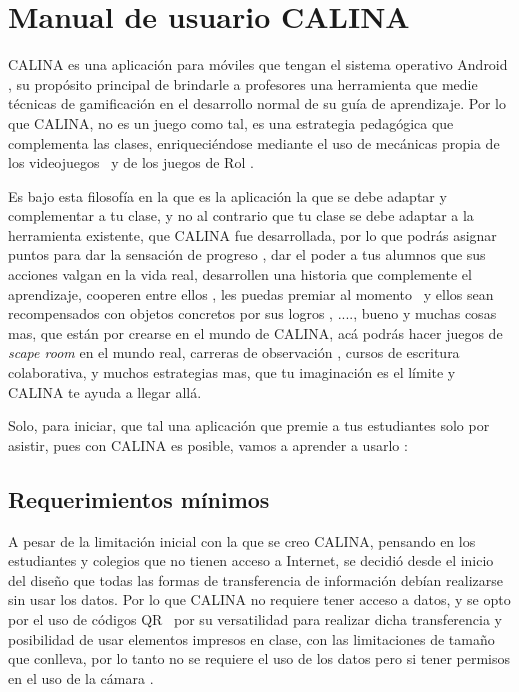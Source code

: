 %

\chapter{Manual de usuario CALINA}

CALINA es una aplicación para móviles que tengan el sistema operativo Android \faAndroid, su propósito 
principal de brindarle a profesores una herramienta que medie técnicas de gamificación en el
desarrollo normal de su guía de aprendizaje. Por lo que CALINA, no es un juego como tal, es una estrategia 
pedagógica que complementa las clases, enriqueciéndose mediante el uso de mecánicas propia de los videojuegos 
\faGamepad\ y de los juegos de Rol \faShield.

Es bajo esta filosofía en la que es la aplicación la que se debe adaptar y complementar a tu clase, y no al 
contrario que tu clase se debe adaptar a la herramienta existente, que CALINA fue desarrollada, por lo que 
podrás asignar puntos para dar la sensación de progreso \faStarO, dar el poder a tus alumnos que sus acciones 
valgan en la vida real, desarrollen una historia que complemente el aprendizaje, cooperen entre ellos 
\faUsers, les puedas premiar al momento \faGift\ y ellos sean recompensados con objetos concretos por sus 
logros \faTrophy, ...., bueno y muchas cosas mas, que están por crearse en el mundo de CALINA, acá podrás 
hacer juegos de \textit{scape room} en el mundo real, carreras de observación \faMap, cursos de escritura 
colaborativa, y muchos estrategias mas, que tu imaginación es el límite y CALINA te ayuda a llegar allá.

Solo, para iniciar, que tal una aplicación que premie a tus estudiantes solo por asistir, pues con CALINA es 
posible, vamos a aprender a usarlo \faHeart:

\section{Requerimientos mínimos}

A pesar de la limitación inicial con la que se creo CALINA, pensando en los estudiantes y colegios que no 
tienen acceso a Internet, se decidió desde el inicio del diseño que todas las formas de transferencia de 
información debían realizarse sin usar los datos. Por lo que CALINA no requiere tener acceso a datos, y se 
opto por el uso de códigos QR \faQrcode\ por su versatilidad para realizar dicha transferencia y posibilidad 
de usar elementos impresos en clase, con las limitaciones de tamaño que conlleva, por lo tanto no se requiere 
el uso de los datos pero si tener permisos en el uso de la cámara \faCamera.

